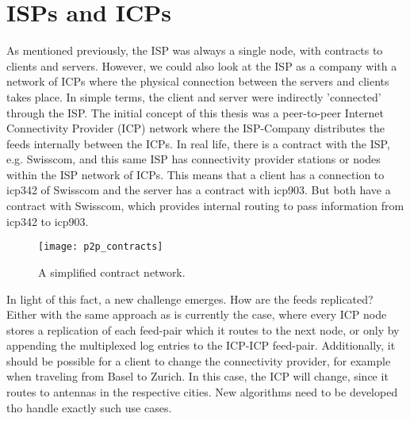 \section{ISPs and ICPs}
As mentioned previously, the ISP was always a single node, with contracts to clients and servers. However, we could also look at the ISP as a company with a network of ICPs where the physical connection between the servers and clients takes place. In simple terms, the client and server were indirectly ’connected’ through the ISP. The initial concept of this thesis was a peer-to-peer Internet Connectivity Provider (ICP) network where the ISP-Company distributes the feeds internally between the ICPs. In real life, there is a contract with the ISP, e.g. Swisscom, and this same ISP has connectivity provider stations or nodes within the ISP network of ICPs. This means that a client has a connection to icp342 of Swisscom and the server has a contract with icp903. But both have a contract with Swisscom, which provides internal routing to pass information from icp342 to icp903.
\begin{figure}
    \centering
    \texttt{[image: p2p\_contracts]}
    \caption{A simplified contract network.}
    \label{fig:contract_network}
\end{figure}
In light of this fact, a new challenge emerges. How are the feeds replicated? Either with the same approach as is currently the case, where every ICP node stores a replication of each feed-pair which it routes to the next node, or only by appending the multiplexed log entries to the ICP-ICP feed-pair. Additionally,  it should be possible for a client to change the connectivity provider, for example when traveling from Basel to Zurich. In this case, the ICP will change, since it routes to antennas in the respective cities. New algorithms need to be developed tho handle exactly such use cases.

